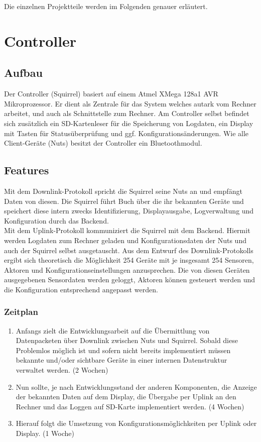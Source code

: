 \documentclass[12pt,a4paper]{article}
\begin{document}
Die einzelnen Projektteile werden im Folgenden genauer erläutert.

\section{Controller}

\subsection{Aufbau}

Der Controller (Squirrel) basiert auf einem Atmel XMega 128a1 AVR Mikroprozessor.
Er dient als Zentrale für das System welches autark vom Rechner arbeitet, und auch als Schnittstelle zum Rechner.
Am Controller selbst befindet sich zusätzlich ein SD-Kartenleser für die Speicherung von Logdaten, ein Display mit Tasten für Statusüberprüfung und ggf. Konfigurationsänderungen.
Wie alle Client-Geräte (Nuts) besitzt der Controller ein Bluetoothmodul.\\

\subsection{Features}
Mit dem Downlink-Protokoll spricht die Squirrel seine Nuts an und empfängt Daten von diesen. Die Squirrel führt Buch über die ihr bekannten Geräte und speichert diese intern zwecks Identifizierung, Displayausgabe, Logverwaltung und Konfiguration durch das Backend.\\
Mit dem Uplink-Protokoll kommuniziert die Squirrel mit dem Backend. Hiermit werden Logdaten zum Rechner geladen und Konfigurationsdaten der Nuts und auch der Squirrel selbst ausgetauscht.
Aus dem Entwurf des Downlink-Protokolls ergibt sich theoretisch die Möglichkeit 254 Geräte mit je insgesamt 254 Sensoren, Aktoren und Konfigurationseinstellungen anzusprechen. Die von diesen Geräten ausgegebenen Sensordaten werden geloggt, Aktoren können gesteuert werden und die Konfiguration entsprechend angepasst werden.

\subsubsection{Zeitplan}
\begin{enumerate}
	\item Anfangs zielt die Entwicklungsarbeit auf die Übermittlung von Datenpacketen über Downlink zwischen Nuts und Squirrel. Sobald diese Problemlos möglich ist und sofern nicht bereits implementiert müssen bekannte und/oder sichtbare Geräte in einer internen Datenstruktur verwaltet werden. (2 Wochen)
	\item Nun sollte, je nach Entwicklungsstand der anderen Komponenten, die Anzeige der bekannten Daten auf dem Display, die Übergabe per Uplink an den Rechner und das Loggen auf SD-Karte implementiert werden. (4 Wochen)
	\item Hierauf folgt die Umsetzung von Konfigurationsmöglichkeiten per Uplink oder Display. (1 Woche)
\end{enumerate}
\end{document}

